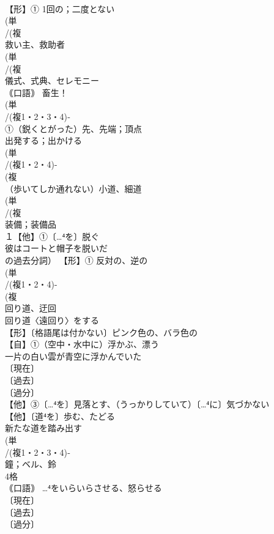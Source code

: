 \documentclass[8pt]{extreport}
\begin{document}
\begin{CJK}{UTF8}{min}
\\	【形】① 1回の；二度とない
\\	(単
\\	/(複
\\	救い主、救助者 
\\	(単
\\	/(複
\\	儀式、式典、セレモニー 
\\	｟口語｠ 畜生！
\\	(単
\\	/(複1・2・3・4)‐
\\	①（鋭くとがった）先、先端；頂点 
\\	出発する；出かける
\\	(単
\\	/(複1・2・4)-
\\	(複
\\	（歩いてしか通れない）小道、細道 
\\	(単
\\	/(複
\\	装備；装備品 
\\	１【他】①〔…⁴を〕脱ぐ 
\\	彼はコートと帽子を脱いだ
\\	の過去分詞） 【形】① 反対の、逆の 
\\	(単
\\	/(複1・2・4)-
\\	(複
\\	回り道、迂回 
\\	回り道〈遠回り〉をする
\\	【形】〔格語尾は付かない〕ピンク色の、バラ色の 
\\	【自】①（空中・水中に）浮かぶ、漂う 
\\	一片の白い雲が青空に浮かんでいた
\\	〔現在〕
\\	〔過去〕
\\	〔過分〕
\\	【他】③〔…⁴を〕見落とす、（うっかりしていて）〔…⁴に〕気づかない
\\	【他】〔道⁴を〕歩む、たどる 
\\	新たな道を踏み出す 
\\	(単
\\	/(複1・2・3・4)‐
\\	鐘；ベル、鈴 
\\	4格 
\\	｟口語｠ …⁴をいらいらさせる、怒らせる
\\	〔現在〕
\\	〔過去〕
\\	〔過分〕

\end{CJK}
\end{document}

